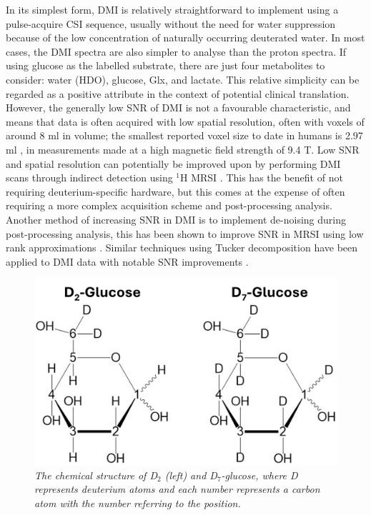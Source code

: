 In its simplest form, \ac{DMI} is relatively straightforward to implement using a pulse-acquire \ac{CSI} sequence, usually without the need for water suppression because of the low concentration of naturally occurring deuterated water. In most cases, the \ac{DMI} spectra are also simpler to analyse than the proton spectra. If using glucose as the labelled substrate, there are just four metabolites to consider: water (\ac{HDO}), glucose, Glx, and lactate. This relative simplicity can be regarded as a positive attribute in the context of potential clinical translation. However, the generally low \ac{SNR} of \ac{DMI} is not a favourable characteristic, and means that data is often acquired with low spatial resolution, often with voxels of around 8 ml \cite{DeFeyter2021DeuteriumFuture, deGraaf2020OnImaging} in volume; the smallest reported voxel size to date in humans is 2.97 ml \cite{Ruhm2022Dynamic9.4T}, in measurements made at a high magnetic field strength of 9.4 T. Low \ac{SNR} and spatial resolution can potentially be improved upon by performing \ac{DMI} scans through indirect detection using $^1$H \ac{MRSI} \cite{vanZijl2020SpectroscopicFluxes, Bednarik2021DeuteriumBrain, Niess2023Reproducibility3T, Ruhm2022Dynamic9.4T}. This has the benefit of not requiring deuterium-specific hardware, but this comes at the expense of often requiring a more complex acquisition scheme and post-processing analysis. Another method of increasing \ac{SNR} in \ac{DMI} is to implement de-noising during post-processing analysis, this has been shown to improve \ac{SNR} in \ac{MRSI} using low rank approximations \cite{Nguyen2013DenoisingApproximations}. Similar techniques using Tucker decomposition \cite{Tucker1966SomeAnalysis, Bader2007EfficientTensors} have been applied to \ac{DMI} data with notable \ac{SNR} improvements \cite{vonMorze2021ComparisonT, Kreis2020MeasuringMRI}.

\begin{figure}
    \centering
    \includegraphics[width = 1\textwidth]{Figures/Glucose/Glucose.png}
    \caption{\textit{The chemical structure of D$_2$ (left) and D$_7$-glucose, where D represents deuterium atoms and each number represents a carbon atom with the number referring to the position.}}
    \label{fig:Glu:Glucose}
\end{figure}

